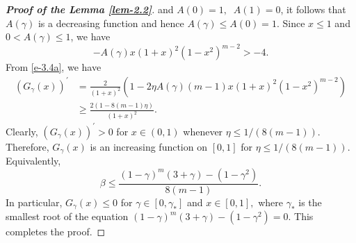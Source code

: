 \documentclass[a4paper,12pt]{amsart}
\theoremstyle{plain}
\theoremstyle{definition}
\begin{document}
\begin{proof}[\bf Proof of the Lemma \ref{lem-2.2}]
	and $ A(0)=1,\;\; A(1)=0$, it follows that $ A(\gamma) $ is a decreasing function and hence $ A(\gamma)\leq A(0)=1. $ Since $ x\leq 1 $ and $ 0<A(\gamma)\leq 1 $, we have 
	\begin{equation*}
		-A(\gamma)x(1+x)^2(1-x^2)^{m-2}>-4.
	\end{equation*}
	From \eqref{e-3.4a}, we have
	\begin{align*}
		\left(G_{\gamma}(x)\right)^{\prime}&=\frac{2}{(1+x)^2}\left(1-2\eta  A(\gamma)(m-1)x(1+x)^2(1-x^2)^{m-2}\right)\\&\geq \frac{2\left(1-8(m-1)\eta\right)}{(1+x)^2}.
	\end{align*}
	Clearly, $ \left(G_{\gamma}(x)\right)^{\prime}>0 $ for $ x\in (0,1) $ whenever $ \eta\leq 1/(8(m-1)). $ Therefore, $ G_{\gamma}(x) $ is an increasing function on $ [0,1] $ for $ \eta\leq 1/(8(m-1))$.  Equivalently,
	\begin{equation*}
		\beta\leq \frac{(1-\gamma)^m(3+\gamma)-(1-\gamma^2)}{8(m-1)}.
	\end{equation*} In particular, $ G_{\gamma}(x)\leq 0 $ for $ \gamma\in [0,\gamma_*] $ and $ x\in [0,1], $ where $ \gamma_* $ is the smallest root of the equation $ (1-\gamma)^m(3+\gamma)-(1-\gamma^2)=0 $. This completes the proof. 
\end{proof}	
\end{document}
